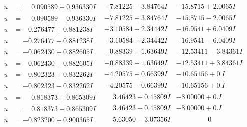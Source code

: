 \documentclass[1p]{elsarticle_modified}
\theoremstyle{definition}
\begin{document}
$$\begin{array}{c|c|c}
\begin{aligned}
u &= \phantom{-}0.090589 + 0.936330 I\end{aligned}
 & -7.81225 - 3.84764 I & -15.8715 + 2.0065 I \\ \hline\begin{aligned}
u &= \phantom{-}0.090589 - 0.936330 I\end{aligned}
 & -7.81225 + 3.84764 I & -15.8715 - 2.0065 I \\ \hline\begin{aligned}
u &= -0.276477 + 0.881238 I\end{aligned}
 & -3.10584 - 2.34442 I & -16.9541 + 6.0409 I \\ \hline\begin{aligned}
u &= -0.276477 - 0.881238 I\end{aligned}
 & -3.10584 + 2.34442 I & -16.9541 - 6.0409 I \\ \hline\begin{aligned}
u &= -0.062430 + 0.882605 I\end{aligned}
 & -0.88339 + 1.63649 I & -12.53411 - 3.84361 I \\ \hline\begin{aligned}
u &= -0.062430 - 0.882605 I\end{aligned}
 & -0.88339 - 1.63649 I & -12.53411 + 3.84361 I \\ \hline\begin{aligned}
u &= -0.802323 + 0.832262 I\end{aligned}
 & -4.20575 + 0.66399 I & -10.65156 + 0. I\phantom{ +0.000000I} \\ \hline\begin{aligned}
u &= -0.802323 - 0.832262 I\end{aligned}
 & -4.20575 - 0.66399 I & -10.65156 + 0. I\phantom{ +0.000000I} \\ \hline\begin{aligned}
u &= \phantom{-}0.818373 + 0.865309 I\end{aligned}
 & \phantom{-}3.46423 + 0.45809 I & -8.00000 + 0. I\phantom{ +0.000000I} \\ \hline\begin{aligned}
u &= \phantom{-}0.818373 - 0.865309 I\end{aligned}
 & \phantom{-}3.46423 - 0.45809 I & -8.00000 + 0. I\phantom{ +0.000000I} \\ \hline\begin{aligned}
u &= -0.823200 + 0.900365 I\end{aligned}
 & \phantom{-}5.63050 - 3.07356 I & \phantom{-0.000000 } 0 \\ \hline\begin{aligned}

\end{aligned}
\end{array}$$
\end{document}
